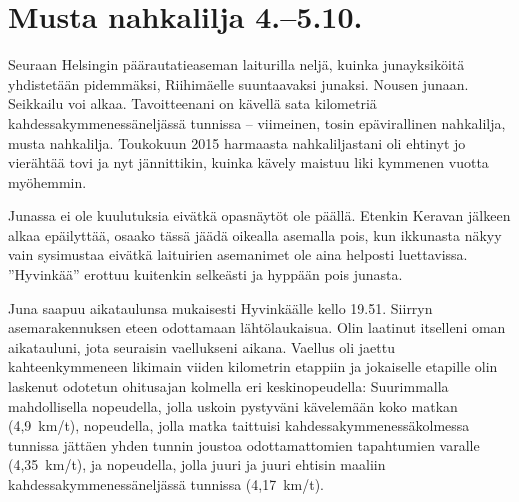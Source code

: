 \section{Musta nahkalilja 4.--5.10.}

\begin{multicols}{2}
\noindent Seuraan Helsingin päärautatieaseman laiturilla neljä, kuinka 
junayksiköitä yhdistetään pidemmäksi, Riihimäelle suuntaavaksi junaksi. 
Nousen junaan. Seikkailu voi alkaa. Tavoitteenani on kävellä sata kilometriä 
kahdessakymmenessäneljässä tunnissa -- viimeinen, tosin epävirallinen 
nahkalilja, musta nahkalilja. Toukokuun 2015 harmaasta nahkaliljastani oli 
ehtinyt jo vierähtää tovi ja nyt jännittikin, kuinka kävely maistuu liki 
kymmenen vuotta myöhemmin.

Junassa ei ole kuulutuksia eivätkä opasnäytöt ole päällä. Etenkin 
Keravan jälkeen alkaa epäilyttää, osaako tässä jäädä oikealla asemalla 
pois, kun ikkunasta näkyy vain sysimustaa eivätkä laituirien asemanimet ole 
aina helposti luettavissa. ''Hyvinkää'' erottuu kuitenkin selkeästi ja 
hyppään pois junasta. 

Juna saapuu aikataulunsa mukaisesti Hyvinkäälle kello 19.51. Siirryn 
asemarakennuksen eteen odottamaan lähtölaukaisua. Olin laatinut itselleni 
oman aikatauluni, jota seuraisin vaellukseni aikana. Vaellus oli jaettu 
kahteenkymmeneen likimain viiden kilometrin etappiin ja jokaiselle etapille 
olin laskenut odotetun ohitusajan kolmella eri keskinopeudella: Suurimmalla 
mahdollisella nopeudella, jolla uskoin pystyväni kävelemään koko matkan 
(4,9~km/t), nopeudella, jolla matka taittuisi kahdessakymmenessäkolmessa 
tunnissa jättäen yhden tunnin joustoa odottamattomien tapahtumien varalle 
(4,35~km/t), ja nopeudella, jolla juuri ja juuri ehtisin maaliin 
kahdessakymmenessäneljässä tunnissa (4,17~km/t).


\end{multicols}

